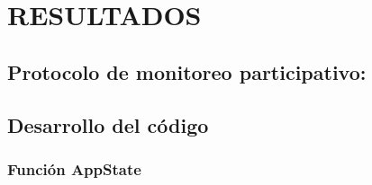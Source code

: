 \chapter{RESULTADOS}


\section{Protocolo de monitoreo participativo:}

\section{Desarrollo del código}


\subsection{Función AppState}

